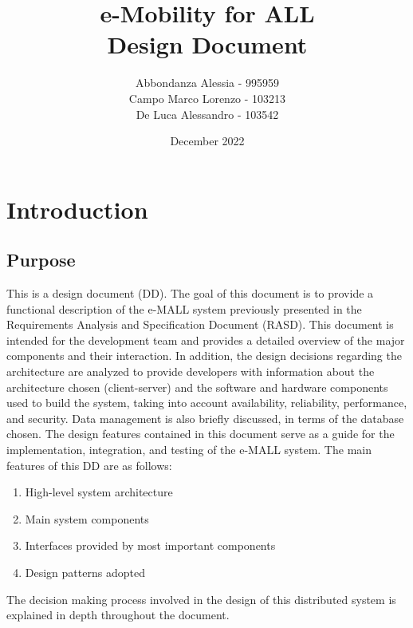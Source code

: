 \documentclass[12pt]{report}
\title{%
  \textbf{e-Mobility for ALL} \\
  \large Design Document \\}
\author{Abbondanza Alessia - 995959\\
    Campo Marco Lorenzo - 103213\\
    De Luca Alessandro - 103542}
\date{December 2022}
\newcommand\blankpage{%
    \null
    \thispagestyle{empty}%
    \newpage}
\begin{document}
\maketitle
\thispagestyle{empty}
\tableofcontents %
\thispagestyle{empty}
\cleardoublepage
\afterpage{\blankpage}

\chapter{Introduction}
\section{Purpose}
This is a design document (DD). The goal of this document is to provide a functional description of the e-MALL system previously presented in the Requirements Analysis and Specification Document (RASD). This document is intended for the development team and provides a detailed overview of the major components and their interaction.
In addition, the design decisions regarding the architecture are analyzed to provide developers with information about the architecture chosen (client-server) and the software and hardware components used to build the system, taking into account availability, reliability, performance, and security. Data management is also briefly discussed, in terms of the database chosen.
The design features contained in this document serve as a guide for the implementation, integration, and testing of the e-MALL system. The main features of this DD are as follows:
\begin{enumerate}
    \item High-level system architecture
    \item Main system components
    \item Interfaces provided by most important components
    \item Design patterns adopted
\end{enumerate}
The decision making process involved in the design of this distributed system is explained in depth throughout the document.
\end{document}
